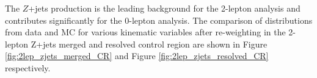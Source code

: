 The $Z$+jets production is the leading background for the 2-lepton analysis and contributes significantly for the 0-lepton analysis. The comparison of distributions from data and MC for various kinematic variables after re-weighting in the 2-lepton Z+jets merged and resolved control region are shown in Figure \ref{fig:2lep_zjets_merged_CR} and Figure \ref{fig:2lep_zjets_resolved_CR}
respectively. 





